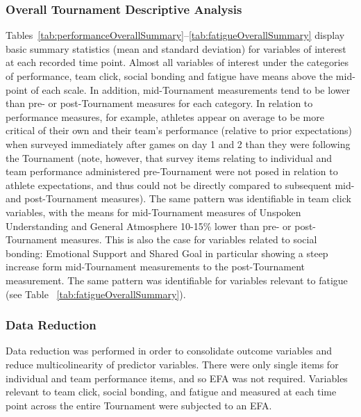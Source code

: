 \subsubsection{Overall Tournament Descriptive Analysis}

Tables~\ref{tab:performanceOverallSummary}\nobreakdash--\ref{tab:fatigueOverallSummary} display basic summary statistics (mean and standard deviation) for variables of interest at each recorded time point. Almost all variables of interest under the categories of performance, team click, social bonding and fatigue have means above the mid-point of each scale. In addition, mid-Tournament measurements tend to be lower than pre- or post-Tournament measures for each category. In relation to performance measures, for example, athletes appear on average to be more critical of their own and their team’s performance (relative to prior expectations) when surveyed immediately after games on day 1 and 2 than they were following the Tournament (note, however, that survey items relating to individual and team performance administered pre-Tournament were not posed in relation to athlete expectations, and thus could not be directly compared to subsequent mid- and post-Tournament measures). The same pattern was identifiable in team click variables, with the means for mid-Tournament measures of Unspoken Understanding and General Atmosphere 10-15\% lower than pre- or post-Tournament measures. This is also the case for variables related to social bonding: Emotional Support and Shared Goal in particular showing a steep increase form mid-Tournament measurements to the post-Tournament measurement. The same pattern was identifiable for variables relevant to fatigue (see Table ~\ref{tab:fatigueOverallSummary}).









\subsubsection{Data Reduction}

Data reduction was performed in order to consolidate outcome variables and reduce multicolinearity of predictor variables. There were only single items for individual and team performance items, and so EFA was not required. Variables relevant to team click, social bonding, and fatigue and measured at each time point across the entire Tournament  were subjected to an EFA.

